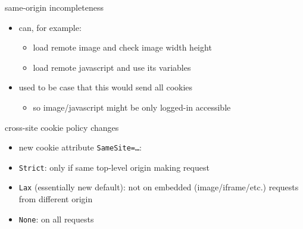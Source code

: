 

\begin{frame}{same-origin incompleteness}
    \begin{itemize}
    \item can, for example: 
        \begin{itemize}
        \item load remote image and check image width height
        \item load remote javascript and use its variables
        \end{itemize}
    \item used to be case that this would send all cookies
        \begin{itemize}
        \item so image/javascript might be only logged-in accessible
        \end{itemize}
    \end{itemize}
\end{frame}

\begin{frame}{cross-site cookie policy changes}
    \begin{itemize}
    \item new cookie attribute \texttt{SameSite=\ldots}:
    \item \texttt{Strict}: only if same top-level origin making request
    \item \texttt{Lax} (essentially new default): not on embedded (image/iframe/etc.) requests from different origin
    \item \texttt{None}: on all requests
    \end{itemize}
\end{frame}
